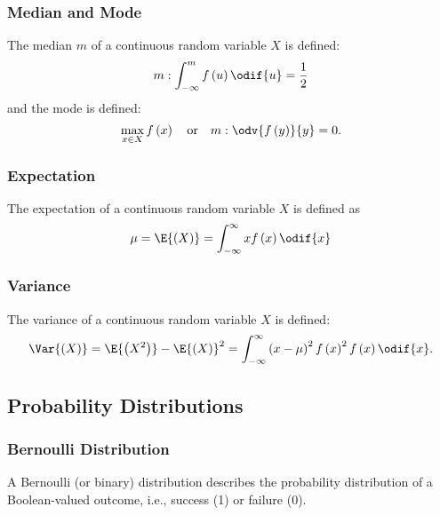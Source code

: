 \documentclass{article}
\begin{document}
\subsubsection{Median and Mode}
The median \(m\) of a continuous random variable \(X\) is defined:
\begin{equation*}
    m : \int_{-\infty}^m f\left( u \right) \odif{u} = \frac{1}{2}
\end{equation*}
and the mode is defined:
\begin{equation*}
    \max_{x \in X} f\left( x \right) \quad \text{or} \quad m:\odv{f\left( y \right)}{y} = 0.
\end{equation*}
\subsubsection{Expectation}
The expectation of a continuous random variable \(X\) is defined as
\begin{equation*}
    \mu = \E{\left( X \right)} = \int_{-\infty}^\infty x f\left( x \right) \odif{x}
\end{equation*}
\subsubsection{Variance}
The variance of a continuous random variable \(X\) is defined:
\begin{equation*}
    \Var{\left( X \right)} = \E{\left( X^2 \right)} - \E{\left( X \right)}^2 = \int_{-\infty}^\infty \left( x - \mu \right)^2 f\left( x \right)^2 f\left( x \right) \odif{x}.
\end{equation*}
\subsection{Probability Distributions}
\subsubsection{Bernoulli Distribution}
A Bernoulli (or binary) distribution describes the probability distribution of a Boolean-valued
outcome, i.e., success (1) or failure (0).
\end{document}
